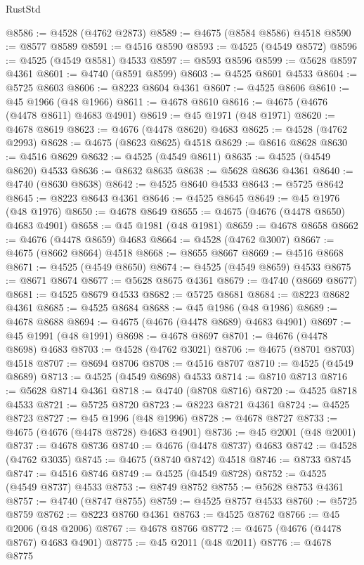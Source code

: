 \begin{lexlean}{RustStd}
\begin{coremodule}
@8586 := @4528 (@4762 @2873)
@8589 := @4675 (@8584 @8586) @4518
@8590 := @8577 @8589
@8591 := @4516 @8590
@8593 := @4525 (@4549 @8572)
@8596 := @4525 (@4549 @8581) @4533
@8597 := @8593 @8596
@8599 := @5628 @8597 @4361
@8601 := @4740 (@8591 @8599)
@8603 := @4525 @8601 @4533
@8604 := @5725 @8603
@8606 := @8223 @8604 @4361
@8607 := @4525 @8606
@8610 := @45 @1966 (@48 @1966)
@8611 := @4678 @8610
@8616 := @4675 (@4676 (@4478 @8611) @4683 @4901)
@8619 := @45 @1971 (@48 @1971)
@8620 := @4678 @8619
@8623 := @4676 (@4478 @8620) @4683
@8625 := @4528 (@4762 @2993)
@8628 := @4675 (@8623 @8625) @4518
@8629 := @8616 @8628
@8630 := @4516 @8629
@8632 := @4525 (@4549 @8611)
@8635 := @4525 (@4549 @8620) @4533
@8636 := @8632 @8635
@8638 := @5628 @8636 @4361
@8640 := @4740 (@8630 @8638)
@8642 := @4525 @8640 @4533
@8643 := @5725 @8642
@8645 := @8223 @8643 @4361
@8646 := @4525 @8645
@8649 := @45 @1976 (@48 @1976)
@8650 := @4678 @8649
@8655 := @4675 (@4676 (@4478 @8650) @4683 @4901)
@8658 := @45 @1981 (@48 @1981)
@8659 := @4678 @8658
@8662 := @4676 (@4478 @8659) @4683
@8664 := @4528 (@4762 @3007)
@8667 := @4675 (@8662 @8664) @4518
@8668 := @8655 @8667
@8669 := @4516 @8668
@8671 := @4525 (@4549 @8650)
@8674 := @4525 (@4549 @8659) @4533
@8675 := @8671 @8674
@8677 := @5628 @8675 @4361
@8679 := @4740 (@8669 @8677)
@8681 := @4525 @8679 @4533
@8682 := @5725 @8681
@8684 := @8223 @8682 @4361
@8685 := @4525 @8684
@8688 := @45 @1986 (@48 @1986)
@8689 := @4678 @8688
@8694 := @4675 (@4676 (@4478 @8689) @4683 @4901)
@8697 := @45 @1991 (@48 @1991)
@8698 := @4678 @8697
@8701 := @4676 (@4478 @8698) @4683
@8703 := @4528 (@4762 @3021)
@8706 := @4675 (@8701 @8703) @4518
@8707 := @8694 @8706
@8708 := @4516 @8707
@8710 := @4525 (@4549 @8689)
@8713 := @4525 (@4549 @8698) @4533
@8714 := @8710 @8713
@8716 := @5628 @8714 @4361
@8718 := @4740 (@8708 @8716)
@8720 := @4525 @8718 @4533
@8721 := @5725 @8720
@8723 := @8223 @8721 @4361
@8724 := @4525 @8723
@8727 := @45 @1996 (@48 @1996)
@8728 := @4678 @8727
@8733 := @4675 (@4676 (@4478 @8728) @4683 @4901)
@8736 := @45 @2001 (@48 @2001)
@8737 := @4678 @8736
@8740 := @4676 (@4478 @8737) @4683
@8742 := @4528 (@4762 @3035)
@8745 := @4675 (@8740 @8742) @4518
@8746 := @8733 @8745
@8747 := @4516 @8746
@8749 := @4525 (@4549 @8728)
@8752 := @4525 (@4549 @8737) @4533
@8753 := @8749 @8752
@8755 := @5628 @8753 @4361
@8757 := @4740 (@8747 @8755)
@8759 := @4525 @8757 @4533
@8760 := @5725 @8759
@8762 := @8223 @8760 @4361
@8763 := @4525 @8762
@8766 := @45 @2006 (@48 @2006)
@8767 := @4678 @8766
@8772 := @4675 (@4676 (@4478 @8767) @4683 @4901)
@8775 := @45 @2011 (@48 @2011)
@8776 := @4678 @8775

\end{coremodule}
\end{lexlean}
